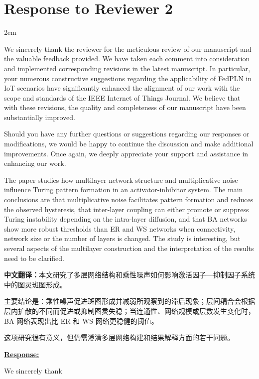 \documentclass[a4paper,12pt]{article}
\newcommand{\zhtranslationfirst}[1]{%
    \par\medskip\noindent
    {\small\color{blue!60!black}\textbf{中文翻译：}#1}\par
}
\newcommand{\zhtranslation}[1]{%
    \par\smallskip\noindent
    {\small\color{blue!60!black}#1}\par
}
\begin{document}
\newpage
\section*{Response to Reviewer 2}
\parindent 2em

We sincerely thank the reviewer for the meticulous review of our manuscript and the valuable feedback provided.
We have taken each comment into consideration and implemented corresponding revisions in the latest manuscript.
In particular, your numerous constructive suggestions regarding the applicability of FedPLN in IoT scenarios have significantly enhanced the alignment of our work with the scope and standards of the IEEE Internet of Things Journal.
We believe that with these revisions, the quality and completeness of our manuscript have been substantially improved.

Should you have any further questions or suggestions regarding our responses or modifications, we would be happy to continue the discussion and make additional improvements.
Once again, we deeply appreciate your support and assistance in enhancing our work.

\begin{tcolorbox}[title = {General Comment},fonttitle = \bfseries]
    The paper studies how multilayer network structure and multiplicative noise influence Turing pattern formation in an activator-inhibitor system. The main conclusions are that multiplicative noise facilitates pattern formation and reduces the observed hysteresis, that inter-layer coupling can either promote or suppress Turing instability depending on the intra-layer diffusion, and that BA networks show more robust thresholds than ER and WS networks when connectivity, network size or the number of layers is changed. The study is interesting, but several aspects of the multilayer construction and the interpretation of the results need to be clarified.
    \zhtranslationfirst{本文研究了多层网络结构和乘性噪声如何影响激活因子—抑制因子系统中的图灵斑图形成。}
    \zhtranslation{主要结论是：乘性噪声促进斑图形成并减弱所观察到的滞后现象；层间耦合会根据层内扩散的不同而促进或抑制图灵失稳；当连通性、网络规模或层数发生变化时，BA 网络表现出比 ER 和 WS 网络更稳健的阈值。}
    \zhtranslation{这项研究很有意义，但仍需澄清多层网络构建和结果解释方面的若干问题。}
\end{tcolorbox}

\noindent \underline {\textbf{Response:}}
\bigskip

We sincerely thank
\end{document}

